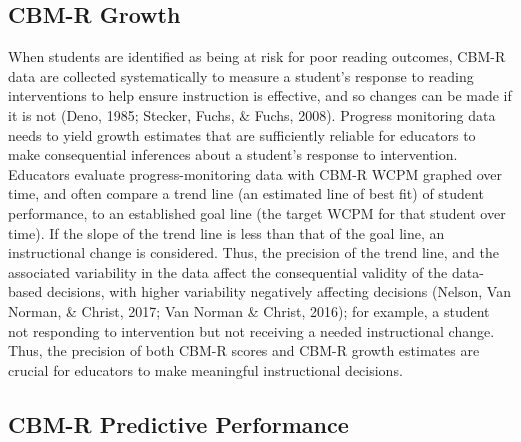 \documentclass[
  english,
  man, fleqn, noextraspace]{apa6}
\begin{document}
\hypertarget{cbm-r-growth}{%
\subsection{CBM-R Growth}\label{cbm-r-growth}}

When students are identified as being at risk for poor reading outcomes, CBM-R data are collected systematically to measure a student's response to reading interventions to help ensure instruction is effective, and so changes can be made if it is not (Deno, 1985; Stecker, Fuchs, \& Fuchs, 2008). Progress monitoring data needs to yield growth estimates that are sufficiently reliable for educators to make consequential inferences about a student's response to intervention. Educators evaluate progress-monitoring data with CBM-R WCPM graphed over time, and often compare a trend line (an estimated line of best fit) of student performance, to an established goal line (the target WCPM for that student over time). If the slope of the trend line is less than that of the goal line, an instructional change is considered. Thus, the precision of the trend line, and the associated variability in the data affect the consequential validity of the data-based decisions, with higher variability negatively affecting decisions (Nelson, Van Norman, \& Christ, 2017; Van Norman \& Christ, 2016); for example, a student not responding to intervention but not receiving a needed instructional change. Thus, the precision of both CBM-R scores and CBM-R growth estimates are crucial for educators to make meaningful instructional decisions.

\hypertarget{cbm-r-predictive-performance}{%
\subsection{CBM-R Predictive Performance}\label{cbm-r-predictive-performance}}
\end{document}
